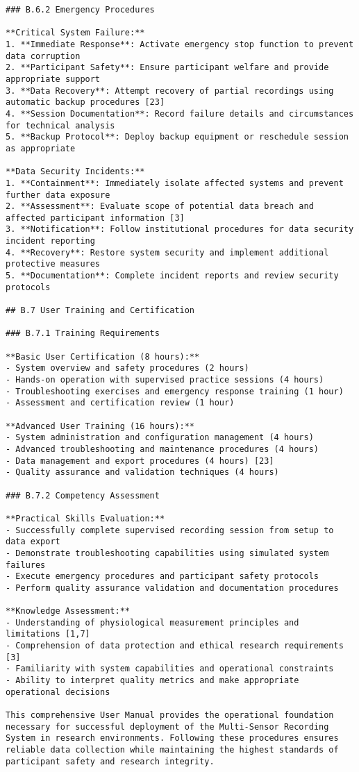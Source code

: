 \begin{verbatim}
### B.6.2 Emergency Procedures

**Critical System Failure:**
1. **Immediate Response**: Activate emergency stop function to prevent data corruption
2. **Participant Safety**: Ensure participant welfare and provide appropriate support
3. **Data Recovery**: Attempt recovery of partial recordings using automatic backup procedures [23]
4. **Session Documentation**: Record failure details and circumstances for technical analysis
5. **Backup Protocol**: Deploy backup equipment or reschedule session as appropriate

**Data Security Incidents:**
1. **Containment**: Immediately isolate affected systems and prevent further data exposure
2. **Assessment**: Evaluate scope of potential data breach and affected participant information [3]
3. **Notification**: Follow institutional procedures for data security incident reporting
4. **Recovery**: Restore system security and implement additional protective measures
5. **Documentation**: Complete incident reports and review security protocols

## B.7 User Training and Certification

### B.7.1 Training Requirements

**Basic User Certification (8 hours):**
- System overview and safety procedures (2 hours)
- Hands-on operation with supervised practice sessions (4 hours)
- Troubleshooting exercises and emergency response training (1 hour)
- Assessment and certification review (1 hour)

**Advanced User Training (16 hours):**
- System administration and configuration management (4 hours)
- Advanced troubleshooting and maintenance procedures (4 hours)
- Data management and export procedures (4 hours) [23]
- Quality assurance and validation techniques (4 hours)

### B.7.2 Competency Assessment

**Practical Skills Evaluation:**
- Successfully complete supervised recording session from setup to data export
- Demonstrate troubleshooting capabilities using simulated system failures
- Execute emergency procedures and participant safety protocols
- Perform quality assurance validation and documentation procedures

**Knowledge Assessment:**
- Understanding of physiological measurement principles and limitations [1,7]
- Comprehension of data protection and ethical research requirements [3]
- Familiarity with system capabilities and operational constraints
- Ability to interpret quality metrics and make appropriate operational decisions

This comprehensive User Manual provides the operational foundation necessary for successful deployment of the Multi-Sensor Recording System in research environments. Following these procedures ensures reliable data collection while maintaining the highest standards of participant safety and research integrity.
\end{verbatim}
